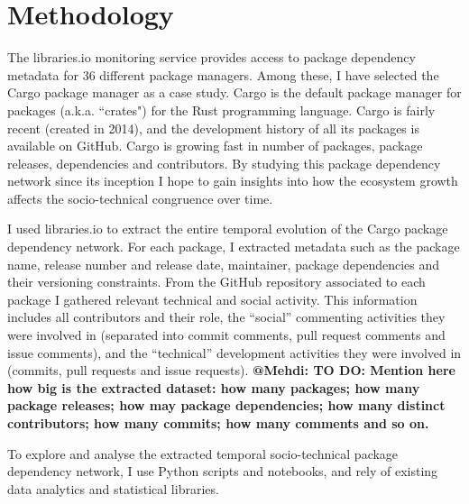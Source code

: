\section{Methodology}

The \textsf{libraries.io} monitoring service provides access to package dependency metadata for 36 different package managers.
Among these, I have selected the Cargo package manager as a case study. Cargo is the default package manager for packages (a.k.a. ``crates") for the Rust programming language. Cargo is fairly recent (created in 2014), and the development history of all its packages is available on GitHub. Cargo is growing fast in number of packages, package releases, dependencies and contributors. By studying this package dependency network since its inception I hope to gain insights into how the ecosystem growth affects the socio-technical congruence over time.

I used libraries.io to extract the entire temporal evolution of the Cargo package dependency network. For each package, I extracted metadata such as the package name, release number and release date, maintainer, package dependencies and their versioning constraints.
From the GitHub repository associated to each package I gathered relevant technical and social activity. This information includes all contributors and their role, the ``social'' commenting activities they were involved in (separated into commit comments, pull request comments and issue comments), and the ``technical'' development activities they were involved in (commits, pull requests and issue requests).
\textbf{\color{red}@Mehdi: TO DO: Mention here how big is the extracted dataset: how many packages; how many package releases; how may package dependencies; how many distinct contributors; how many commits; how many comments and so on.}

To explore and analyse the extracted temporal socio-technical package dependency network, I use Python scripts and notebooks, and rely of existing data analytics and statistical libraries.


